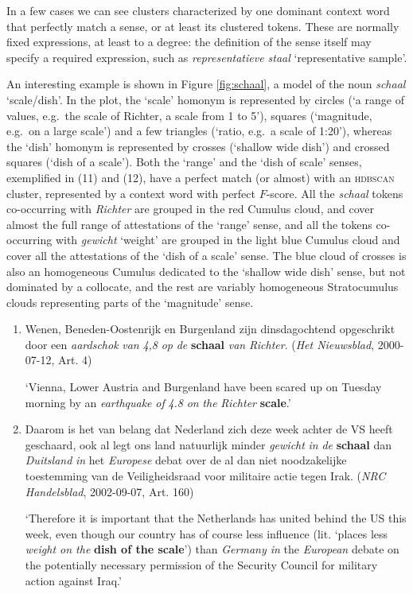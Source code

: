 \documentclass[
]{book}
\begin{document}
In a few cases we can see clusters characterized by one dominant context word that perfectly match a sense, or at least its clustered tokens. These are normally fixed expressions, at least to a degree: the definition of the sense itself may specify a required expression, such as \emph{representatieve staal} `representative sample'.

An interesting example is shown in Figure \ref{fig:schaal}, a model of the noun \emph{schaal} `scale/dish'. In the plot, the `scale' homonym is represented by circles (`a range of values, e.g.~the scale of Richter, a scale from 1 to 5'), squares (`magnitude, e.g.~on a large scale') and a few triangles (`ratio, e.g.~a scale of 1:20'), whereas the `dish' homonym is represented by crosses (`shallow wide dish') and crossed squares (`dish of a scale').
Both the `range' and the `dish of scale' senses, exemplified in (11) and (12), have a perfect match (or almost) with an \textsc{hdbscan} cluster, represented by a context word with perfect \(F\)-score. All the \emph{schaal} tokens co-occurring with \emph{Richter} are grouped in the red Cumulus cloud, and cover almost the full range of attestations of the `range' sense, and all the tokens co-occurring with \emph{gewicht} `weight' are grouped in the light blue Cumulus cloud and cover all the attestations of the `dish of a scale' sense. The blue cloud of crosses is also an homogeneous Cumulus dedicated to the `shallow wide dish' sense, but not dominated by a collocate, and the rest are variably homogeneous Stratocumulus clouds representing parts of the `magnitude' sense.

\begin{enumerate}
\def\labelenumi{(\arabic{enumi})}
\setcounter{enumi}{10}
\item
  Wenen, Beneden-Oostenrijk en Burgenland zijn dinsdagochtend opgeschrikt door een \emph{aardschok} \emph{van} \emph{4,8} \emph{op} \emph{de} \textbf{schaal} \emph{van} \emph{Richter}. (\emph{Het Nieuwsblad}, 2000-07-12, Art. 4)

  `Vienna, Lower Austria and Burgenland have been scared up on Tuesday morning by an \emph{earthquake} \emph{of} \emph{4.8} \emph{on} \emph{the} \emph{Richter} \textbf{scale}.'
\item
  Daarom is het van belang dat Nederland zich deze week achter de VS heeft geschaard, ook al legt ons land natuurlijk minder \emph{gewicht} \emph{in} \emph{de} \textbf{schaal} dan \emph{Duitsland} \emph{in} het \emph{Europese} debat over de al dan niet noodzakelijke toestemming van de Veiligheidsraad voor militaire actie tegen Irak. (\emph{NRC Handelsblad}, 2002-09-07, Art. 160)

  `Therefore it is important that the Netherlands has united behind the US this week, even though our country has of course less influence (lit. `places less \emph{weight on the} \textbf{dish of the scale}') than \emph{Germany in} the \emph{European} debate on the potentially necessary permission of the Security Council for military action against Iraq.'
\end{enumerate}
\end{document}
